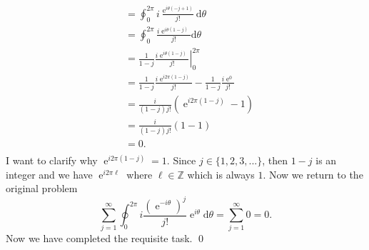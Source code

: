 \documentclass[10pt]{amsart}
\newcommand{\D}{\mathrm{d}}
\DeclareMathOperator{\E}{e}
\theoremstyle{nonumberplain}
\begin{document}
\begin{enumerate}[label={\bf {\arabic*}:}]
\begin{align*}
	&=\oint_0^{2\pi} i \frac{\E^{i\theta\left( - j + 1\right)}}{j!} \D \theta \\
	&=\oint_0^{2\pi} \frac{i\E^{i\theta\left(1 - j\right)}}{j!} \D \theta \\
	&= \left. \frac{1}{1 - j} \frac{i\E^{i\theta\left(1 - j\right)}}{j!} \right|_0^{2 \pi} \\
	&= \frac{1}{1 - j} \frac{i\E^{i2\pi\left(1 - j\right)}}{j!} - \frac{1}{1 - j} \frac{i\E^0}{j!} \\
	&= \frac{i}{\left(1 - j\right)j!}\left(\E^{i2\pi\left(1 - j\right)} - 1 \right) \\
	&= \frac{i}{\left(1 - j\right)j!}\left(1 - 1 \right) \\
	&= 0. \\
\end{align*}
I want to clarify why $\E^{i2\pi\left(1 - j\right)} = 1$.
Since $j \in \{1, 2, 3, ...\}$, then $1 - j$ is an integer and we have $\E^{i2\pi \ell}$ where $\ell \in \mathbb Z$ which is always $1$.
Now we return to the original problem
$$
\sum_{j=1}^{\infty} \oint_0^{2\pi} i \frac{\left(\E^{-i\theta}\right)^j}{j!} {\E^{i\theta}} \D \theta = \sum_{j=1}^{\infty} 0 = 0.
$$
Now we have completed the requisite task.
\qed
\\


\end{enumerate}
\end{document}
